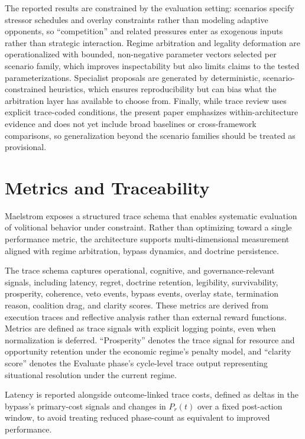 \documentclass[11pt,a4paper]{article}
\begin{document}
The reported results are constrained by the evaluation setting: scenarios specify stressor schedules and overlay constraints rather than modeling adaptive opponents, so ``competition'' and related pressures enter as exogenous inputs rather than strategic interaction. Regime arbitration and legality deformation are operationalized with bounded, non-negative parameter vectors selected per scenario family, which improves inspectability but also limits claims to the tested parameterizations. Specialist proposals are generated by deterministic, scenario-constrained heuristics, which ensures reproducibility but can bias what the arbitration layer has available to choose from. Finally, while trace review uses explicit trace-coded conditions, the present paper emphasizes within-architecture evidence and does not yet include broad baselines or cross-framework comparisons, so generalization beyond the scenario families should be treated as provisional.

\section{Metrics and Traceability}

Maelstrom exposes a structured trace schema that enables systematic evaluation of volitional behavior under constraint. Rather than optimizing toward a single performance metric, the architecture supports multi-dimensional measurement aligned with regime arbitration, bypass dynamics, and doctrine persistence.

The trace schema captures operational, cognitive, and governance-relevant signals, including latency, regret, doctrine retention, legibility, survivability, prosperity, coherence, veto events, bypass events, overlay state, termination reason, coalition drag, and clarity scores. These metrics are derived from execution traces and reflective analysis rather than external reward functions. Metrics are defined as trace signals with explicit logging points, even when normalization is deferred. ``Prosperity'' denotes the trace signal for resource and opportunity retention under the economic regime's penalty model, and ``clarity score'' denotes the Evaluate phase's cycle-level trace output representing situational resolution under the current regime.

Latency is reported alongside outcome-linked trace costs, defined as deltas in the bypass's primary-cost signals and changes in $P_r(t)$ over a fixed post-action window, to avoid treating reduced phase-count as equivalent to improved performance.
\end{document}
